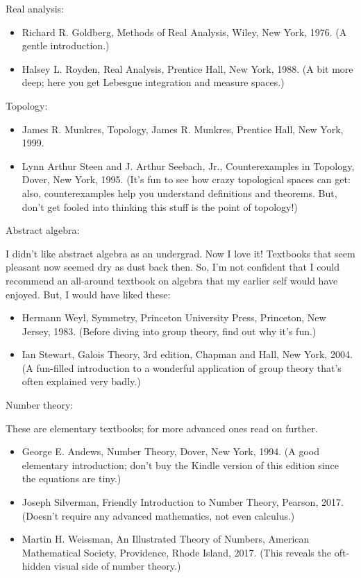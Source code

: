 \documentclass[10pt,a4paper]{book}
\theoremstyle{definition}
\begin{document}
Real analysis:

\begin{itemize}
\item  Richard R. Goldberg, Methods of Real Analysis, Wiley, New York, 1976. (A gentle introduction.)

\item Halsey L. Royden, Real Analysis, Prentice Hall, New York, 1988. (A bit more deep; here you get Lebesgue integration and measure spaces.)
\end{itemize}

Topology:

\begin{itemize}
\item  James R. Munkres, Topology, James R. Munkres, Prentice Hall, New York, 1999.

\item Lynn Arthur Steen and J. Arthur Seebach, Jr., Counterexamples in Topology, Dover, New York, 1995. (It's fun to see how crazy topological spaces can get: also, counterexamples help you understand definitions and theorems. But, don't get fooled into thinking this stuff is the point of topology!)
\end{itemize}

Abstract algebra:

I didn't like abstract algebra as an undergrad. Now I love it! Textbooks that seem pleasant now seemed dry as dust back then. So, I'm not confident that I could recommend an all-around textbook on algebra that my earlier self would have enjoyed. But, I would have liked these:

\begin{itemize}
\item Hermann Weyl, Symmetry, Princeton University Press, Princeton, New Jersey, 1983. (Before diving into group theory, find out why it's fun.)

\item Ian Stewart, Galois Theory, 3rd edition, Chapman and Hall, New York, 2004. (A fun-filled introduction to a wonderful application of group theory that's often explained very badly.)
\end{itemize}

Number theory:

These are elementary textbooks; for more advanced ones read on further.

\begin{itemize}
\item George E. Andews, Number Theory, Dover, New York, 1994. (A good elementary introduction; don't buy the Kindle version of this edition since the equations are tiny.)
\item Joseph Silverman, Friendly Introduction to Number Theory, Pearson, 2017. (Doesn't require any advanced mathematics, not even calculus.)
\item Martin H. Weissman, An Illustrated Theory of Numbers, American Mathematical Society, Providence, Rhode Island, 2017. (This reveals the oft-hidden visual side of number theory.)
\end{itemize}
\end{document}
